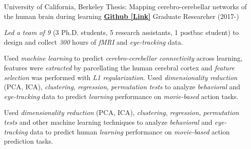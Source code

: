 

\begin{cventries}

  \cventry
    {University of California, Berkeley} %
    {Thesis: Mapping cerebro-cerebellar networks of the human brain during learning}
    {\href{https://github.com/maedbhk/cerebellum_learning_connect}{\textbf{Github [Link]}}}
    {Graduate Researcher (2017-)} %
    {
      \begin{cvitems} %
        \item {\textit{Led a team of 9} (3 Ph.D. students, 5 research assistants, 1 postbac student) to design and collect \textit{300} hours of \textit{fMRI} and \textit{eye-tracking} data.}
        \item {Used \textit{machine learning} to predict \textit{cerebro-cerebellar connectivity} across learning, features were \textit{extracted} by parcellating the human cerebral cortex and \textit{feature selection} was performed with \textit{L1 regularization}. Used \textit{dimensionality reduction} (PCA, ICA), \textit{clustering}, \textit{regression}, \textit{permutation tests}  to analyze \textit{behavioral} and \textit{eye-tracking} data to predict \textit{learning} performance on \textit{movie-based} action tasks.}
        \item {Used \textit{dimensionality reduction} (PCA, ICA), \textit{clustering}, \textit{regression}, \textit{permutation tests} and other machine learning techniques to analyze \textit{behavioral} and \textit{eye-tracking} data to predict human \textit{learning} performance on \textit{movie-based} action prediction tasks.}
      \end{cvitems}
    }
    

\end{cventries}

